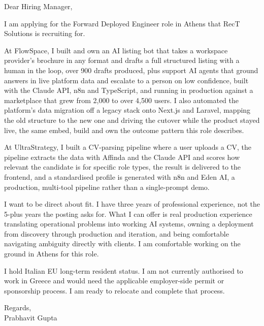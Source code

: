 \documentclass[a4paper,11pt]{article}
\begin{document}
Dear Hiring Manager,

I am applying for the Forward Deployed Engineer role in Athens that RecT Solutions is recruiting for.

At FlowSpace, I built and own an AI listing bot that takes a workspace provider's brochure in any format and drafts a full structured listing with a human in the loop, over 900 drafts produced, plus support AI agents that ground answers in live platform data and escalate to a person on low confidence, built with the Claude API, n8n and TypeScript, and running in production against a marketplace that grew from 2,000 to over 4,500 users. I also automated the platform's data migration off a legacy stack onto Next.js and Laravel, mapping the old structure to the new one and driving the cutover while the product stayed live, the same embed, build and own the outcome pattern this role describes.

At UltraStrategy, I built a CV-parsing pipeline where a user uploads a CV, the pipeline extracts the data with Affinda and the Claude API and scores how relevant the candidate is for specific role types, the result is delivered to the frontend, and a standardised profile is generated with n8n and Eden AI, a production, multi-tool pipeline rather than a single-prompt demo.

I want to be direct about fit. I have three years of professional experience, not the 5-plus years the posting asks for. What I can offer is real production experience translating operational problems into working AI systems, owning a deployment from discovery through production and iteration, and being comfortable navigating ambiguity directly with clients. I am comfortable working on the ground in Athens for this role.

I hold Italian EU long-term resident status. I am not currently authorised to work in Greece and would need the applicable employer-side permit or sponsorship process. I am ready to relocate and complete that process.

Regards,\\
Prabhavit Gupta
\end{document}
